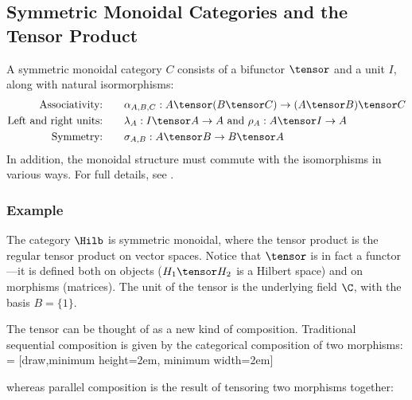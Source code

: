 \subsection{Symmetric Monoidal Categories and the Tensor Product}

\begin{definition}
A symmetric monoidal category $C$ consists of a bifunctor $\tensor$
and a unit $I$, along with natural isormorphisms:
\begin{align*}
    \text{Associativity:}&\qquad 
    \alpha_{A,B,C} : A \tensor (B \tensor C) \rightarrow (A \tensor B) \tensor C \\
    \text{Left and right units:}&\qquad 
    \lambda_A : I \tensor A \rightarrow A \text{ and } \rho_A : A \tensor I \rightarrow A \\
    \text{Symmetry:}&\qquad 
    \sigma_{A,B} : A \tensor B \rightarrow B \tensor A \\
\end{align*}
In addition, the monoidal structure must commute with the isomorphisms in 
various ways. For full details, see \citet{bierman1995categorical}.
\end{definition}

\subsubsection*{Example}
The category $\Hilb$ is symmetric monoidal, where the tensor product
is the regular tensor product on vector spaces. Notice that $\tensor$ is
in fact a functor---it is defined both on objects ($H_1 \tensor H_2$ is a Hilbert space)
and on morphisms (matrices).
The unit of the tensor is the underlying field $\C$, with the basis $B = \{ 1 \}$.

The tensor can be thought of as a new kind of composition. Traditional
sequential composition is given by the categorical composition of two morphisms:
 = [draw,minimum height=2em, minimum width=2em]
\begin{center}  \end{center}
whereas parallel composition is the result of tensoring two morphisms together:
\begin{center}  \end{center}

